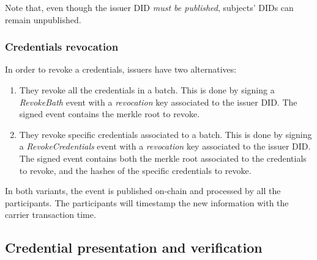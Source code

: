 \documentclass[10pt,a4paper]{article}
\begin{document}
Note that, even though the issuer DID \emph{must be published}, subjects' DIDs can remain unpublished.

\subsubsection{Credentials revocation}

In order to revoke a credentials, issuers have two alternatives:
\begin{enumerate}
\item They revoke all the credentials in a batch.
      This is done by signing a \emph{RevokeBath} event with a \emph{revocation} key associated to the issuer DID.
      The signed event contains the merkle root to revoke.
\item They revoke specific credentials associated to a batch.
      This is done by signing a \emph{RevokeCredentials} event with a \emph{revocation} key associated to the issuer DID. 
      The signed event contains both the merkle root associated to the credentials to revoke, and the hashes of the specific credentials to revoke.
\end{enumerate}

In both variants, the event is published on-chain and processed by all the participants. The participants will timestamp the new information with the carrier transaction time.

\subsection{Credential presentation and verification}
\end{document}
